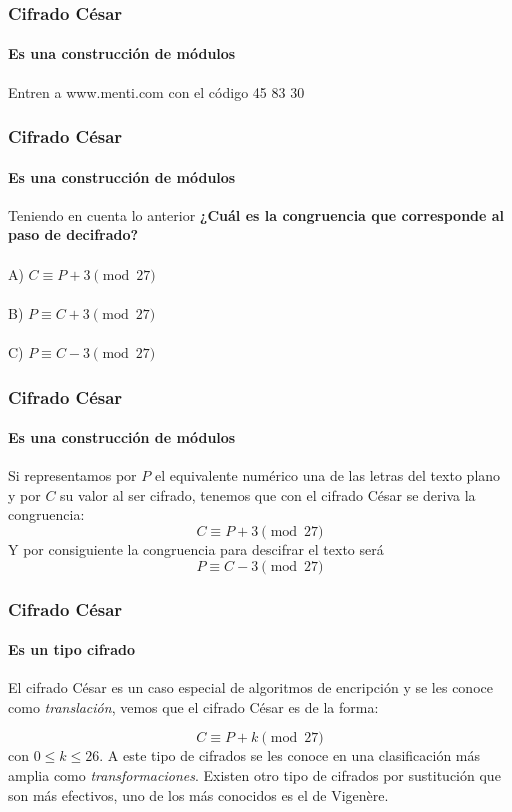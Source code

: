 \documentclass[spanish, mexico]{beamer}
\begin{document}
	\begin{frame}
		\frametitle{Cifrado César}
		\framesubtitle{Es una construcción de módulos}
		\begin{center}
		    Entren a www.menti.com con el código 45 83 30 
		\end{center}
	\end{frame}
	
	\begin{frame}
		\frametitle{Cifrado César}
		\framesubtitle{Es una construcción de módulos}
		Teniendo en cuenta lo anterior \textbf{¿Cuál es la congruencia que corresponde al paso de decifrado?}\\~\\
		A) $C \equiv P + 3 \pmod{27}$\\~\\
		B) $P \equiv C + 3 \pmod{27}$\\~\\
		C) $P \equiv C - 3 \pmod{27}$
	\end{frame}

	\begin{frame}
		\frametitle{Cifrado César}
		\framesubtitle{Es una construcción de módulos}
		\begin{table}[]
			\centering
		\end{table}
		Si representamos por $P$ el equivalente numérico una de las letras del texto plano y por $C$ su valor al ser cifrado, tenemos que con el cifrado César se deriva la congruencia:
		$$C \equiv P + 3 \pmod{27}$$
		Y por consiguiente la congruencia para descifrar el texto será
		$$P \equiv C - 3 \pmod{27}$$ 
	\end{frame}

	\begin{frame}
		\frametitle{Cifrado César}
		\framesubtitle{Es un tipo cifrado}
		El cifrado César es un caso especial de algoritmos de encripción y se les conoce como \textit{translación}, vemos que el cifrado César es de la forma:
		
		$$C \equiv P + k \pmod{27}$$
		con $0 \leq k \leq 26$. A este tipo de cifrados se les conoce en una clasificación más amplia como \textit{transformaciones}. Existen otro tipo de cifrados por sustitución que son más efectivos, uno de los más conocidos es el de Vigenère.
	\end{frame}
\end{document}
